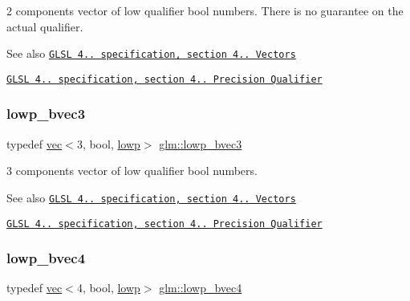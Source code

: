 2 components vector of low qualifier bool numbers. There is no guarantee on the actual qualifier.

\begin{DoxySeeAlso}{See also}
\href{http://www.opengl.org/registry/doc/GLSLangSpec.4.20.8.pdf}{\tt G\+L\+SL 4.. specification, section 4.. Vectors} 

\href{http://www.opengl.org/registry/doc/GLSLangSpec.4.20.8.pdf}{\tt G\+L\+SL 4.. specification, section 4.. Precision Qualifier} 
\end{DoxySeeAlso}
\mbox{\label{group__core__precision_gad68503417ddfd296669e9af59f3e0d1c}} 
\subsubsection{\texorpdfstring{lowp\+\_\+bvec3}{lowp\_bvec3}}
{\footnotesize\ttfamily typedef \hyperlink{structglm_1_1vec}{vec}$<$3, bool, \hyperlink{namespaceglm_a36ed105b07c7746804d7fdc7cc90ff25ae161af3fc695e696ce3bf69f7332bc2d}{lowp}$>$ \hyperlink{group__core__precision_gad68503417ddfd296669e9af59f3e0d1c}{glm\+::lowp\+\_\+bvec3}}

3 components vector of low qualifier bool numbers.

\begin{DoxySeeAlso}{See also}
\href{http://www.opengl.org/registry/doc/GLSLangSpec.4.20.8.pdf}{\tt G\+L\+SL 4.. specification, section 4.. Vectors} 

\href{http://www.opengl.org/registry/doc/GLSLangSpec.4.20.8.pdf}{\tt G\+L\+SL 4.. specification, section 4.. Precision Qualifier} 
\end{DoxySeeAlso}
\mbox{\label{group__core__precision_ga9c156bdb6dd02d35826ee77094ff3cdf}} 
\subsubsection{\texorpdfstring{lowp\+\_\+bvec4}{lowp\_bvec4}}
{\footnotesize\ttfamily typedef \hyperlink{structglm_1_1vec}{vec}$<$4, bool, \hyperlink{namespaceglm_a36ed105b07c7746804d7fdc7cc90ff25ae161af3fc695e696ce3bf69f7332bc2d}{lowp}$>$ \hyperlink{group__core__precision_ga9c156bdb6dd02d35826ee77094ff3cdf}{glm\+::lowp\+\_\+bvec4}}

